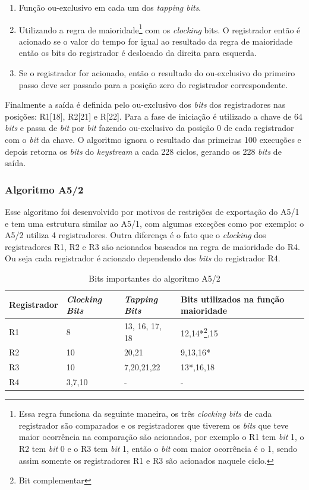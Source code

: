 \begin{enumerate}
\item Função ou-exclusivo em cada um dos \textit{tapping bits}.
\item Utilizando a regra de maioridade\footnote{Essa regra funciona da seguinte maneira, os três \textit{clocking bits} de cada registrador são comparados e os registradores que tiverem os \textit{bits} que teve maior ocorrência na comparação são acionados, por exemplo o R1 tem \textit{bit} 1, o R2 tem \textit{bit} 0 e o R3 tem \textit{bit} 1, então o \textit{bit} com maior ocorrência é o 1, sendo assim somente os registradores R1 e R3 são acionados naquele ciclo.} com os \textit{clocking} bits. O registrador então é acionado se o valor do tempo for igual ao resultado da regra de maioridade então os bits do registrador é deslocado da direita para esquerda.
\item Se o registrador for acionado, então o resultado do ou-exclusivo do primeiro passo deve ser passado para a posição zero do registrador correspondente.
\end{enumerate}

Finalmente a saída é definida pelo ou-exclusivo dos \textit{bits} dos registradores nas posições: R1[18], R2[21] e R[22]. Para a fase de iniciação é utilizado a chave de 64 \textit{bits} e passa de \textit{bit} por \textit{bit} fazendo ou-exclusivo da posição 0 de cada registrador com o \textit{bit} da chave. O algoritmo ignora o resultado das primeiras 100 execuções e depois retorna os \textit{bits} do \textit{keystream} a cada 228 ciclos, gerando os 228 \textit{bits} de saída.

\subsubsection{Algoritmo A5/2}
\label{algorithm-a52}

Esse algoritmo foi desenvolvido por motivos de restrições de exportação do A5/1 e tem uma estrutura similar ao A5/1, com algumas exceções como por exemplo: o A5/2 utiliza 4 registradores. Outra diferença é o fato que o \textit{clocking} dos registradores R1, R2 e R3 são acionados baseados na regra de maioridade do R4. Ou seja cada registrador é acionado dependendo dos \textit{bits} do registrador R4. 

\begin{table}[h]
\centering
	\begin{tabular}{|l|l|l|l|}
		\hline
		Registrador & \textit{Clocking Bits} & \textit{Tapping Bits} & Bits utilizados na função maioridade \\ \hline
		R1 & 8 & 13, 16, 17, 18  & 12,14*\footnote{Bit complementar},15\\ \hline
		R2 & 10 & 20,21 & 9,13,16*\\ \hline
		R3 & 10 & 7,20,21,22 & 13*,16,18\\ \hline	
		R4 & 3,7,10 & - & -\\ \hline
	\end{tabular}
	\caption{Bits importantes do algoritmo A5/2}
\end{table}

